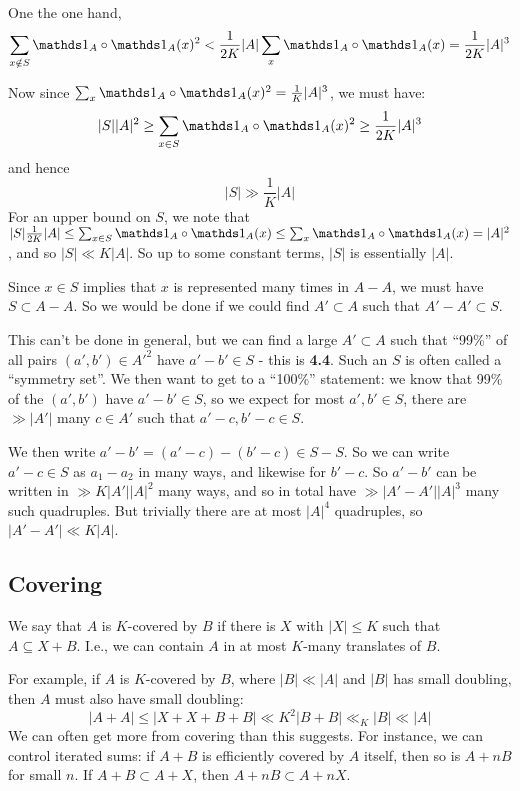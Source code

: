 \documentclass[10pt,a4paper]{article}
\begin{document}
One the one hand,
\[\sum_{x\notin S}\one_A\circ\one_A(x)^2 < \frac{1}{2K}|A|\sum_{x}\one_A\circ\one_A(x) = \frac{1}{2K}|A|^3\]

Now since $\sum_{x} \one_A\circ\one_A(x)^2 = \frac{1}{K}|A|^3$, we must have:
\[|S||A|^2 \geq \sum_{x\in S}\one_A\circ\one_A(x)^2 \geq \frac{1}{2K}|A|^3\]
and hence
\[|S| \gg \frac{1}{K}|A|\]
For an upper bound on $S$, we note that $|S|\frac{1}{2K}|A| \leq \sum_{x \in S}\one_A \circ\one_A(x) \leq \sum_x \one_A\circ\one_A(x) = |A|^2$, and so $|S| \ll K|A|$. So up to some constant terms, $|S|$ is essentially $|A|$.

Since $x \in S$ implies that $x$ is represented many times in $A-A$, we must have $S \subset A-A$. So we would be done if we could find $A'\subset A$ such that $A'-A' \subset S$.

This can't be done in general, but we can find a large $A'\subset A$ such that ``99\%'' of all pairs $(a',b') \in A'^2$ have $a'-b'\in S$ - this is \textbf{4.4}. Such an $S$ is often called a ``symmetry set''. We then want to get to a ``100\%'' statement: we know that 99\% of the $(a',b')$ have $a'-b'\in S$, so we expect for most $a',b' \in S$, there are $\gg |A'|$ many $c\in A'$ such that $a'-c, b'-c \in S$.

We then write $a'-b' = (a'-c)-(b'-c) \in S-S$. So we can write $a'-c \in S$ as $a_1-a_2$ in many ways, and likewise for $b'-c$. So $a'-b'$ can be written in $\gg K|A'||A|^2$ many ways, and so in total have $\gg |A'-A'||A|^3$ many such quadruples. But trivially there are at most $|A|^4$ quadruples, so $|A'-A'|\ll K|A|$.

\subsection{Covering}
We say that $A$ is $K$-covered by $B$ if there is $X$ with $|X| \leq K$ such that $A \subseteq X+B$. I.e., we can contain $A$ in at most $K$-many translates of $B$.

For example, if $A$ is $K$-covered by $B$, where $|B|\ll|A|$ and $|B|$ has small doubling, then $A$ must also have small doubling:
\[|A+A| \leq |X+X+B+B|\ll K^2|B+B|\ll_K |B| \ll |A|\]
We can often get more from covering than this suggests. For instance, we can control iterated sums: if $A+B$ is efficiently covered by $A$ itself, then so is $A+nB$ for small $n$. If $A+B \subset A+X$, then $A+nB \subset A+nX$.
\end{document}

